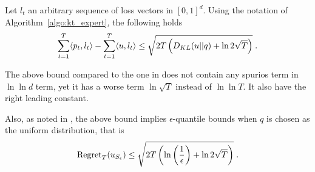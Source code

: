 \begin{cor}
\label{cor:kt_expert}
Let $l_t$ an arbitrary sequence of loss vectors in $[0,1]^d$. Using the notation of Algorithm~\ref{algo:kt_expert}, the following holds
\[
\sum_{t=1}^T \langle p_t, l_t\rangle -\sum_{t=1}^T \langle u , l_t\rangle 
\leq \sqrt{2 T \left(D_{KL}(u||q) +\ln 2\sqrt{T}\right)} \; .
\]
\end{cor}

The above bound compared to the one in \citet{LuoS15} does not contain any spurios term in $\ln \ln d$ term, yet it has a worse term $\ln \sqrt{T}$ instead of $\ln \ln T$. It also have the right leading constant.

Also, as noted in \citet{LuoS15}, the above bound implies $\epsilon$-quantile bounds when $q$ is chosen as the uniform distribution, that is
\[
\operatorname{Regret}_T(u_{S_\epsilon}) \leq \sqrt{2 T \left(\ln\left(\frac{1}{\epsilon}\right) +\ln 2\sqrt{T}\right)} \; .
\]